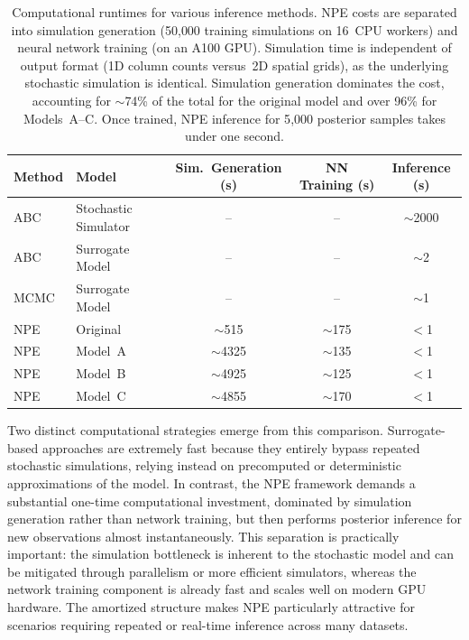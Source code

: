 \documentclass{article}
\begin{document}
\begin{table}[htbp]
	\centering
	\renewcommand{\arraystretch}{1.2} %
	\begin{tabular}{@{}llccc@{}}
		\toprule
		\textbf{Method} & \textbf{Model} & \textbf{Sim.\ Generation (s)} & \textbf{NN Training (s)} & \textbf{Inference (s)} \\
		\midrule
		ABC & Stochastic Simulator & -- & -- & $\sim$2000 \\
		ABC & Surrogate Model & -- & -- & $\sim$2 \\
		MCMC & Surrogate Model & -- & -- & $\sim$1 \\
		\midrule
		NPE & Original & $\sim$515 & $\sim$175 & $<$1 \\
		NPE & Model~A & $\sim$4325 & $\sim$135 & $<$1 \\
		NPE & Model~B & $\sim$4925 & $\sim$125 & $<$1 \\
		NPE & Model~C & $\sim$4855 & $\sim$170 & $<$1 \\
		\bottomrule
	\end{tabular}
		\caption{Computational runtimes for various inference methods. NPE costs are separated into simulation generation (50{,}000 training simulations on 16~CPU workers) and neural network training (on an A100 GPU). Simulation time is independent of output format (1D column counts versus\ 2D spatial grids), as the underlying stochastic simulation is identical. Simulation generation dominates the cost, accounting for $\sim$74\% of the total for the original model and over 96\% for Models~A--C. Once trained, NPE inference for 5{,}000 posterior samples takes under one second.}	\label{tab:runtimes}
\end{table}

Two distinct computational strategies emerge from this comparison. Surrogate-based approaches are extremely fast because they entirely bypass repeated stochastic simulations, relying instead on precomputed or deterministic approximations of the model. In contrast, the NPE framework demands a substantial one-time computational investment, dominated by simulation generation rather than network training, but then performs posterior inference for new observations almost instantaneously. This separation is practically important: the simulation bottleneck is inherent to the stochastic model and can be mitigated through parallelism or more efficient simulators, whereas the network training component is already fast and scales well on modern GPU hardware. The amortized structure makes NPE particularly attractive for scenarios requiring repeated or real-time inference across many datasets.
\end{document}
